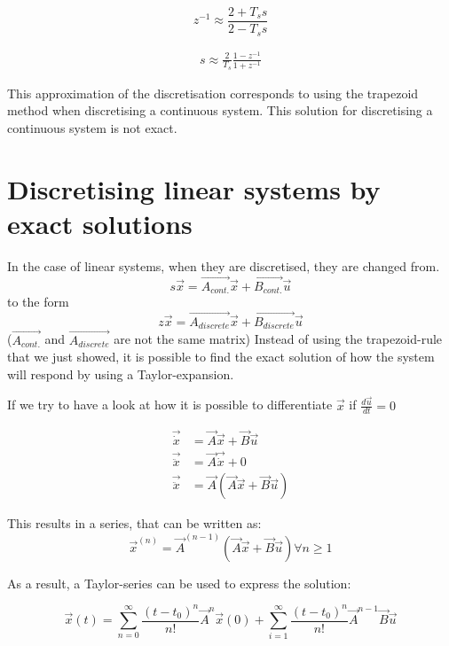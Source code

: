 \begin{equation}
 z^{-1} \approx \frac{2 + T_s s}{2 - T_s s}
\end{equation}{}

\begin{align}
 s \approx \frac{2}{T_s} \frac{1 - z^{-1}}{1 + z^{-1}}
\end{align}{}

This approximation of the discretisation corresponds to using the trapezoid method when discretising a continuous system. This solution for discretising a continuous system is not exact.
\section{Discretising linear systems by exact solutions}
In the case of linear systems, when they are discretised, they are changed from. 
\begin{equation}
 s \Vec{x} = \Vec{A_{cont.}} \Vec{x} + \Vec{B_{cont.}} \Vec{u}
\end{equation}{}
to the form 
\begin{equation}
 z \Vec{x} = \Vec{A_{discrete}} \Vec{x} + \Vec{B_{discrete}} \Vec{u} 
\end{equation}{}
($\Vec{A_{cont.}}$ and $\Vec{A_{discrete}}$ are not the same matrix)
Instead of using the trapezoid-rule that we just showed, it is possible to find the exact solution of how the system will respond by using a Taylor-expansion. 

If we try to have a look at how it is possible to differentiate $\Vec{x}$ if $\frac{d \Vec{u}}{dt}=0$

\begin{align}
 \Vec{\dot{x}} &= \Vec{A} \Vec{x} + \Vec{B}\Vec{u}\\
 \Vec{\ddot{x}} &= \Vec{A} \Vec{\dot{x}} + 0\\
 \Vec{\ddot{x}} &= \Vec{A} \left(\Vec{A} \Vec{x} + \Vec{B}\Vec{u}\right)
\end{align}{}

This results in a series, that can be written as: 
\begin{equation}
 \Vec{x}^{(n)} = \Vec{A}^{(n-1)} ( \Vec{A}\Vec{x} + \Vec{B}\Vec{u}) \forall n \geq 1
\end{equation}{}

As a result, a Taylor-series can be used to express the solution:

\begin{equation}
 \Vec{x}(t) = \sum_{n=0}^\infty \frac{(t-t_0)^n}{n!}\Vec{A}^n\Vec{x}(0) + \sum_{i=1}^\infty \frac{(t-t_0)^n}{n!} \Vec{A}^{n-1}\Vec{B}\Vec{u}
\end{equation}{}


